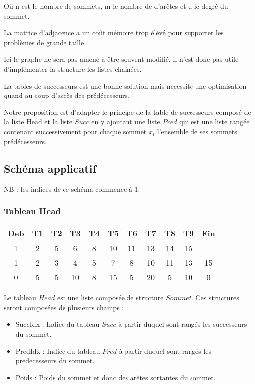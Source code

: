 \documentclass{article}
\begin{document}
Où n est le nombre de sommets, m le nombre de d'arêtes et d le degré du sommet.

La matrice d'adjacence a un coût mémoire trop élévé pour supporter les problèmes de grande taille.

Ici le graphe ne sera pas amené à être souvent modifié, il n'est donc pas utile d'implémenter la structure les listes chainées.

La tables de successeurs est une bonne solution mais necessite une optimisation quand au coup d'accès des prédécesseurs.

Notre proposition est d'adapter le principe de la table de successeurs composé de la liste Head et la liste $Succ$ en y ajoutant une liste $Pred$ qui est une liste rangée contenant successivement pour chaque sommet $x_{i}$ l'ensemble de ses sommets prédécesseurs.

\subsection{Schéma applicatif}

NB : les indices de ce schéma commence à 1.

\subsubsection{Tableau Head}
\begin{tabular}{|c|c|c|c|c|c|c|c|c|c|c|}
\hline
Deb & T1 & T2 & T3 & T4 & T5 & T6 & T7 & T8 & T9 & Fin \\
\hline \hline
1 & 2 & 5 & 6 & 8 & 10 & 11 & 13 & 14 & 15 & \ \\
\hline
1 & 2 & 3 & 4 & 5 & 7 & 8 & 10 & 11 & 13 & 15 \\
\hline
0 & 5 & 5 & 10 & 8 & 15 & 5 & 20 & 5 & 10 & 0 \\
\hline
\end{tabular}

Le tableau $Head$ est une liste composée de structure $Sommet$. Ces structures seront composées de plusieurs champs : 
\begin{itemize}
\item SuccIdx : Indice du tableau $Succ$ à partir duquel sont rangés les successeurs du sommet.
\item PredIdx : Indice du tableau $Pred$ à partir duquel sont rangés les predecesseurs du sommet.
\item Poids : Poids du sommet et donc des arêtes sortantes du sommet.
\end{itemize}
\end{document}
